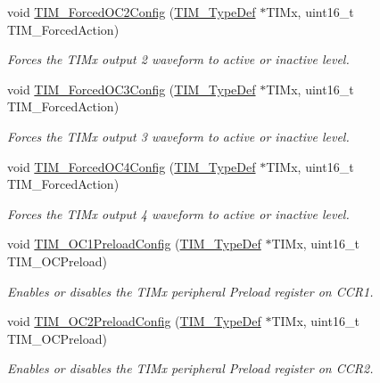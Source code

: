 \begin{DoxyCompactItemize}
void \hyperlink{group___t_i_m_ga3d2902b6fbab8dd55cd531055ffcc63d}{T\+I\+M\+\_\+\+Forced\+O\+C2\+Config} (\hyperlink{struct_t_i_m___type_def}{T\+I\+M\+\_\+\+Type\+Def} $\ast$T\+I\+Mx, uint16\+\_\+t T\+I\+M\+\_\+\+Forced\+Action)
\begin{DoxyCompactList}\small\item\em Forces the T\+I\+Mx output 2 waveform to active or inactive level. \end{DoxyCompactList}\item 
void \hyperlink{group___t_i_m_ga920b0fb4ca44fceffd1c3e441feebd8f}{T\+I\+M\+\_\+\+Forced\+O\+C3\+Config} (\hyperlink{struct_t_i_m___type_def}{T\+I\+M\+\_\+\+Type\+Def} $\ast$T\+I\+Mx, uint16\+\_\+t T\+I\+M\+\_\+\+Forced\+Action)
\begin{DoxyCompactList}\small\item\em Forces the T\+I\+Mx output 3 waveform to active or inactive level. \end{DoxyCompactList}\item 
void \hyperlink{group___t_i_m_gaf0a0bbe74251e56d4b835d20b0a3aa63}{T\+I\+M\+\_\+\+Forced\+O\+C4\+Config} (\hyperlink{struct_t_i_m___type_def}{T\+I\+M\+\_\+\+Type\+Def} $\ast$T\+I\+Mx, uint16\+\_\+t T\+I\+M\+\_\+\+Forced\+Action)
\begin{DoxyCompactList}\small\item\em Forces the T\+I\+Mx output 4 waveform to active or inactive level. \end{DoxyCompactList}\item 
void \hyperlink{group___t_i_m_ga60e6c29ad8f919bef616cf8e3306dd64}{T\+I\+M\+\_\+\+O\+C1\+Preload\+Config} (\hyperlink{struct_t_i_m___type_def}{T\+I\+M\+\_\+\+Type\+Def} $\ast$T\+I\+Mx, uint16\+\_\+t T\+I\+M\+\_\+\+O\+C\+Preload)
\begin{DoxyCompactList}\small\item\em Enables or disables the T\+I\+Mx peripheral Preload register on C\+C\+R1. \end{DoxyCompactList}\item 
void \hyperlink{group___t_i_m_ga75b4614c6dd2cd52f2c5becdb6590c10}{T\+I\+M\+\_\+\+O\+C2\+Preload\+Config} (\hyperlink{struct_t_i_m___type_def}{T\+I\+M\+\_\+\+Type\+Def} $\ast$T\+I\+Mx, uint16\+\_\+t T\+I\+M\+\_\+\+O\+C\+Preload)
\begin{DoxyCompactList}\small\item\em Enables or disables the T\+I\+Mx peripheral Preload register on C\+C\+R2. \end{DoxyCompactList}\item 

\end{DoxyCompactItemize}
